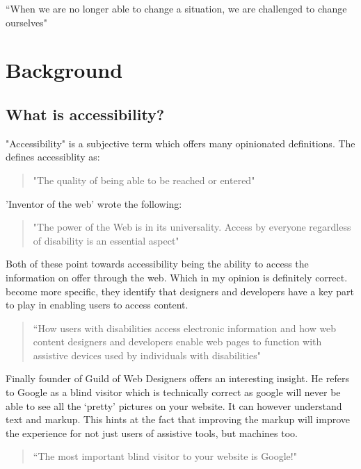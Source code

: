 \begin{savequote}[75mm]
``When we are no longer able to change a situation, we are challenged to
change ourselves"
\end{savequote}

\chapter{Background}
\section{What is accessibility?}
"Accessibility" is a subjective term which offers many opinionated
definitions. The \cite*{OxDict} defines accessiblity as:
\begin{quote}
"The quality of being able to be reached or entered"
\end{quote}

\cite*{TimBerners} 'Inventor of the web' wrote the following:
\begin{quote}
"The power of the Web is in its universality. Access by everyone regardless
of disability is an essential aspect"
\end{quote}

Both of these point towards accessibility being the ability to access the
information on offer through the web. Which in my opinion is definitely
correct. \cite*{Adobe} become more specific, they identify that
designers and
developers have a key part to play in enabling users to access content.

\begin{quote}
``How users with disabilities access electronic information and how web content
designers and developers enable web pages to function with assistive devices
used by individuals with disabilities"
\end{quote}

Finally \cite*{JimByrne} founder of Guild of Web Designers offers an interesting
insight. He refers to Google as a blind visitor which is technically correct
as google will never be able to see all the `pretty' pictures on your website.
It can however understand text and markup. This hints at the fact that
improving the markup will improve the experience for not just users of
assistive tools, but machines too.

\begin{quote}
``The most important blind visitor to your website is Google!"
\end{quote}

